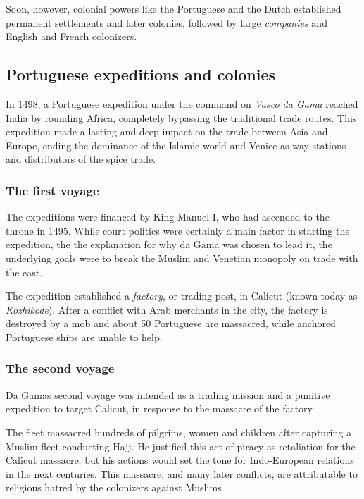 \documentclass[11pt, a4paper, headings=standardclasses]{scrartcl}
\begin{document}
Soon, however, colonial powers like the Portuguese and the Dutch established permanent settlements and later colonies, followed by large \emph{companies} and English and French colonizers.

\subsection{Portuguese expeditions and colonies}

In 1498, a Portuguese expedition under the command on \emph{Vasco da Gama} reached India by rounding Africa, completely bypassing the traditional trade routes\autocite{VdG}. This expedition made a lasting and deep impact on the trade between Asia and Europe, ending the dominance of the Islamic world and Venice as way stations and distributors of the spice trade.\autocite{GLO}

\subsubsection{The first voyage}

The expeditions were financed by King Manuel I, who had ascended to the throne in 1495. While court politics were certainly a main factor in starting the expedition, the the explanation for why da Gama was chosen to lead it, the underlying goals were to break the Muslim and Venetian monopoly on trade with the east.\autocite{Vasco}

The expedition established a \emph{factory}, or trading post, in Calicut (known today as \textit{Kozhikode}). After a conflict with Arab merchants in the city, the factory is destroyed by a mob and  about 50 Portuguese are massacred, while anchored Portuguese ships are unable to help.\autocite{1550}

\subsubsection{The second voyage}

Da Gamas second voyage was intended as a trading mission and a punitive expedition to target Calicut, in response to the massacre of the factory.\autocite{Vasco}

The fleet massacred hundreds of pilgrims, women and children after capturing a Muslim fleet conducting Hajj. He justified this act of piracy as retaliation for the Calicut massacre,\autocite{1550} but his actions would set the tone for Indo-European relations in the next centuries. This massacre, and many later conflicts, are attributable to religious hatred by the colonizers against Muslims\autocite[382]{FT}
\end{document}
